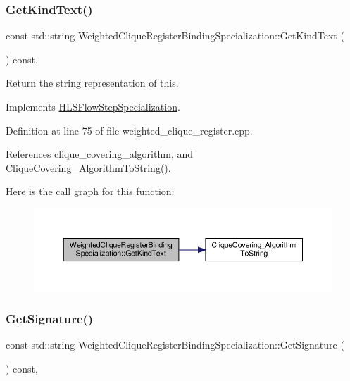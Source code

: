 \subsubsection{\texorpdfstring{Get\+Kind\+Text()}{GetKindText()}}
{\footnotesize\ttfamily const std\+::string Weighted\+Clique\+Register\+Binding\+Specialization\+::\+Get\+Kind\+Text (\begin{DoxyParamCaption}{ }\end{DoxyParamCaption}) const\hspace{0.3cm}{\ttfamily [override]}, {\ttfamily [virtual]}}



Return the string representation of this. 



Implements \hyperlink{classHLSFlowStepSpecialization_abcad0108fa726ac69986e26671a75ec3}{H\+L\+S\+Flow\+Step\+Specialization}.



Definition at line 75 of file weighted\+\_\+clique\+\_\+register.\+cpp.



References clique\+\_\+covering\+\_\+algorithm, and Clique\+Covering\+\_\+\+Algorithm\+To\+String().

Here is the call graph for this function\+:
\nopagebreak
\begin{figure}[H]
\begin{center}
\leavevmode
\includegraphics[width=350pt]{da/d02/classWeightedCliqueRegisterBindingSpecialization_a988d2215af6d7303378ed138b33d93f7_cgraph}
\end{center}
\end{figure}
\mbox{\label{classWeightedCliqueRegisterBindingSpecialization_abced50010cc1e667c05ab536e61edebd}} 
\subsubsection{\texorpdfstring{Get\+Signature()}{GetSignature()}}
{\footnotesize\ttfamily const std\+::string Weighted\+Clique\+Register\+Binding\+Specialization\+::\+Get\+Signature (\begin{DoxyParamCaption}{ }\end{DoxyParamCaption}) const\hspace{0.3cm}{\ttfamily [override]}, {\ttfamily [virtual]}}



